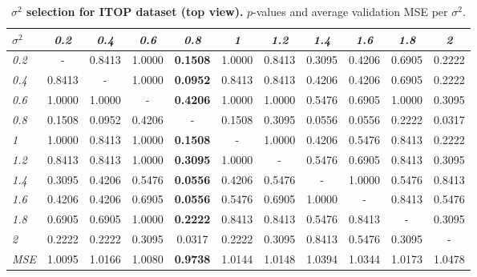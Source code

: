 \documentclass[review,12pt,3p]{elsarticle}
\begin{document}
\begin{table}[t]
\caption{\textbf{$\sigma^2$ selection for ITOP dataset (top view).} $p$-values and average validation MSE per $\sigma^2$.}
\label{tab:statsS2iTOPtview}
\scriptsize %
\begin{center}
\setlength{\tabcolsep}{0.2em} %
\begin{tabular}{|l|c c c c c c c c c c |}
\hline
 $\sigma^2$ & \emph{0.2} & \emph{0.4}& \emph{0.6}& \emph{0.8}& \emph{1}& \emph{1.2}& \emph{1.4}& \emph{1.6}& \emph{1.8}& \emph{2} \\
\hline \emph{0.2} & - & 0.8413 & 1.0000 & \textbf{0.1508} & 1.0000 & 0.8413 & 0.3095 & 0.4206 & 0.6905 & 0.2222  \\
  \hline \emph{0.4} & 0.8413 & - & 1.0000 & \textbf{0.0952} & 0.8413 & 0.8413 & 0.4206 & 0.4206 & 0.6905 & 0.2222  \\
  \hline \emph{0.6} & 1.0000 & 1.0000 & - & \textbf{0.4206} & 1.0000 & 1.0000 & 0.5476 & 0.6905 & 1.0000 & 0.3095  \\
  \hline \emph{0.8} & 0.1508 & 0.0952 & 0.4206 & - & 0.1508 & 0.3095 & 0.0556 & 0.0556 & 0.2222 & 0.0317  \\
  \hline \emph{1} & 1.0000 & 0.8413 & 1.0000 & \textbf{0.1508} & - & 1.0000 & 0.4206 & 0.5476 & 0.8413 & 0.2222  \\
  \hline \emph{1.2} & 0.8413 & 0.8413 & 1.0000 & \textbf{0.3095} & 1.0000 & - & 0.5476 & 0.6905 & 0.8413 & 0.3095  \\
  \hline \emph{1.4} & 0.3095 & 0.4206 & 0.5476 & \textbf{0.0556} & 0.4206 & 0.5476 & - & 1.0000 & 0.5476 & 0.8413  \\
  \hline \emph{1.6} & 0.4206 & 0.4206 & 0.6905 & \textbf{0.0556} & 0.5476 & 0.6905 & 1.0000 & - & 0.8413 & 0.5476  \\
  \hline \emph{1.8} & 0.6905 & 0.6905 & 1.0000 & \textbf{0.2222} & 0.8413 & 0.8413 & 0.5476 & 0.8413 & - & 0.3095  \\
  \hline \emph{2} & 0.2222 & 0.2222 & 0.3095 & 0.0317 & 0.2222 & 0.3095 & 0.8413 & 0.5476 & 0.3095 & -  \\
\hline 
\hline
\textit{MSE} & 1.0095  &  1.0166  &  1.0080&    \textbf{0.9738}&    1.0144&    1.0148 &   1.0394    &1.0344 &   1.0173 &   1.0478\\
\hline
\end{tabular} 
\end{center}
\end{table}
\end{document}

